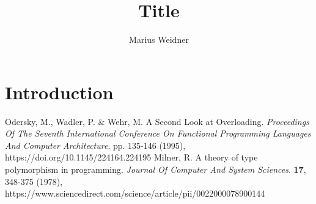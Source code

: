 \documentclass[runningheads]{llncs}
\begin{document}
\title{Title}
\author{Marius Weidner}
\maketitle

\begin{abstract}
\end{abstract}

\section{Introduction}

\begin{thebibliography}{8}

Odersky, M., Wadler, P. \& Wehr, M. A Second Look at Overloading. 
{\em Proceedings Of The Seventh International Conference On Functional Programming Languages And Computer Architecture}. 
pp. 135-146 (1995), https://doi.org/10.1145/224164.224195
Milner, R. A theory of type polymorphism in programming. 
{\em Journal Of Computer And System Sciences}. 
\textbf{17}, 348-375 (1978), https://www.sciencedirect.com/science/article/pii/0022000078900144

\end{thebibliography}
\end{document}
